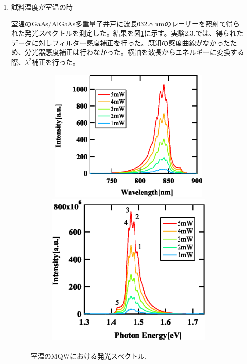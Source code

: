 \documentclass[11pt,a4j]{jsarticle}
\begin{document}
\begin{enumerate}%
 \item 試料温度が室温の時

       室温のGaAs/AlGaAs多重量子井戸に波長632.8 nmのレーザーを照射て得られた発光スペクトルを測定した。結果を図\ref{fig_mqw_rt_spec1}に示す。実験2.3.では、得られたデータに対しフィルター感度補正を行った。既知の感度曲線がなかったため、分光器感度補正は行わなかった。横軸を波長からエネルギーに変換する際、$\lambda^2$補正を行った。

       \begin{figure}[ht]
        \centering
        \begin{tabular}{c}

         \begin{minipage}{0.52\hsize}

          \includegraphics[clip,width=8cm]{start2_MQW_rt_Spectrum_wav.eps}
         \end{minipage}

         \begin{minipage}{0.06\hsize}%
          \hspace{5mm}
         \end{minipage}

         \begin{minipage}{0.5\hsize}
          \centering
          \includegraphics[clip,width=8.3cm]{start2_MQW_rt_Spectrum_eV.eps}
         \end{minipage}
        \end{tabular}
        \caption{室温のMQWにおける発光スペクトル.}
        \label{fig_mqw_rt_spec1}


\end{figure}
\end{enumerate}
\end{document}

